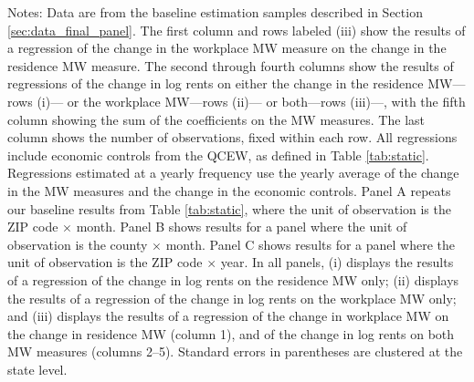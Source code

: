 \begin{landscape}
\begin{table}[ht!]
    \begin{minipage}{.95\linewidth} \footnotesize
        \vspace{2mm}
        Notes:
        Data are from the baseline estimation samples described in Section 
        \ref{sec:data_final_panel}.
        The first column and rows labeled (iii) show the results of a regression 
        of the change in the workplace MW measure on the change in the 
        residence MW measure.
        The second through fourth columns show the results of regressions of the 
        change in log rents on either the change in the residence MW---rows (i)---
        or the workplace MW---rows (ii)--- 
        or both---rows (iii)---, with the fifth column showing the sum of the 
        coefficients on the MW measures.
        The last column shows the number of observations, fixed within each row.
        All regressions include economic controls from the QCEW, as defined in
        Table \ref{tab:static}.
        Regressions estimated at a yearly frequency use the yearly average of
        the change in the MW measures and the change in the economic controls.
        Panel A repeats our baseline results from Table \ref{tab:static}, where 
        the unit of observation is the ZIP code $\times$ month.
        Panel B shows results for a panel where the unit of observation is the 
        county $\times$ month.
        Panel C shows results for a panel where the unit of observation is the 
        ZIP code $\times$ year.
        In all panels,
        (i) displays the results of a regression of the change in log rents on 
        the residence MW only;
        (ii) displays the results of a regression of the change in log 
        rents on the workplace MW only; and
        (iii) displays the results of a regression of the change in workplace
        MW on the change in residence MW (column 1), and of the change in 
        log rents on both MW measures (columns 2--5).
        Standard errors in parentheses are clustered at the state level.
    \end{minipage}
\end{table}
\end{landscape}
